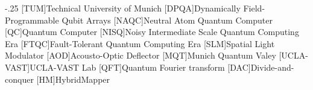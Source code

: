 \documentclass[headsepline,footsepline,footinclude=false,oneside,fontsize=11pt,paper=a4,listof=totoc,bibliography=totoc]{scrbook} %
\begin{document}


\frontmatter{}





\tableofcontents{}

\mainmatter{}








\appendix{}


\begin{acronym}
	\itemsep-.25\baselineskip
	[TUM]{Technical University of Munich}
	[DPQA]{Dynamically Field-Programmable Qubit Arrays}
	[NAQC]{Neutral Atom Quantum Computer}
	[QC]{Quantum Computer}
	[NISQ]{Noisy Intermediate Scale Quantum Computing Era}
	[FTQC]{Fault-Tolerant Quantum Computing Era}
	[SLM]{Spatial Light Modulator}
	[AOD]{Acousto-Optic Deflector}
	[MQT]{Munich Quantum Valey}
	[UCLA-VAST]{UCLA-VAST Lab}
	[QFT]{Quantum Fourier transform}
	[DAC]{Divide-and-conquer}
	[HM]{HybridMapper}
\end{acronym}

\listoffigures{}
\listoftables{}
\printbibliography{}
\end{document}
